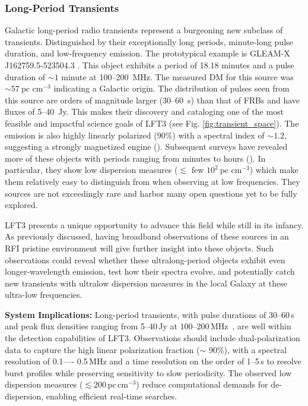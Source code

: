 \subsubsection{Long-Period Transients}
Galactic long-period radio transients represent a burgeoning new subclass of transients. Distinguished by their exceptionally long periods, minute-long pulse duration, and low-frequency emission. The prototypical example is GLEAM-X J162759.5-523504.3 \citep{hurley_walker_radio_2022}. This object exhibits a period of 18.18 minutes and a pulse duration of $\sim 1$ minute at 100--200~MHz. The measured DM for this source was $\sim57~\text{pc cm}^{-3}$ indicating a Galactic origin. The distribution of pulses seen from this source are orders of magnitude larger (30--60~s) than that of FRBs and have fluxes of 5--40~Jy. This makes their discovery and cataloging one of the most feasible and impactful science goals of LFT3 (see Fig. \ref{fig:transient_space}). The emission is also highly linearly polarized (90\%) with a spectral index of $\sim 1.2$, suggesting a strongly magnetized engine (\citealt{Men_2025}).
Subsequent surveys have revealed more of these objects with periods ranging from minutes to hours (\citealt{HW_2024}). In particular, they show low dispersion measures ($\lesssim$ few $10^2~\text{pc cm}^{-3}$) which make them relatively easy to distinguish from when observing at low frequencies. They sources are not exceedingly rare and harbor many open questions yet to be fully explored.

LFT3 presents a unique opportunity to advance this field while still in its infancy. As previously discussed, having broadband observations of these sources in an RFI pristine environment will give further insight into these objects. Such observations could reveal whether these ultralong-period objects exhibit even longer-wavelength emission, test how their spectra evolve, and potentially catch new transients with ultralow dispersion measures in the local Galaxy at these ultra-low frequencies. 

\textbf{System Implications:} Long-period transients, with pulse durations of 30--60\,s and peak flux densities ranging from 5--40\,Jy at 100--200\,MHz~\citep{hurley_walker_radio_2022}, are well within the detection capabilities of LFT3. Observations should include dual-polarization data to capture the high linear polarization fraction ($\sim$ 90\%), with a spectral resolution of 0.1---- 0.5\,MHz and a time resolution on the order of 1--5\,s to resolve burst profiles while preserving sensitivity to slow periodicity. The observed low dispersion measures ($\lesssim$200\,pc\,cm$^{-3}$) reduce computational demands for de-dispersion, enabling efficient real-time searches. 

